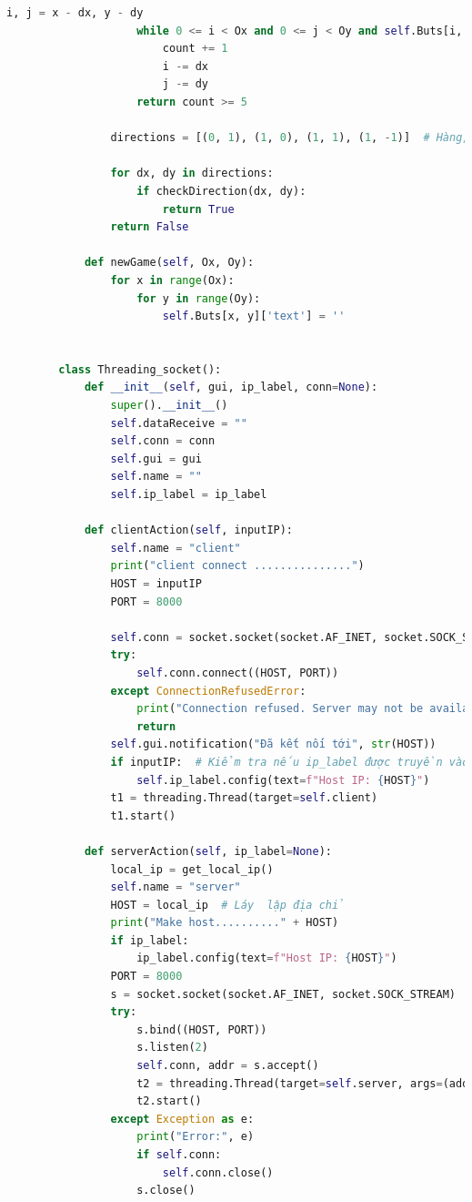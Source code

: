 \documentclass[a4paper]{article}
\begin{document}
\begin{lstlisting}[language=Python]
                    i, j = x - dx, y - dy
                    while 0 <= i < Ox and 0 <= j < Oy and self.Buts[i, j]["text"] == XO:
                        count += 1
                        i -= dx
                        j -= dy
                    return count >= 5
        
                directions = [(0, 1), (1, 0), (1, 1), (1, -1)]  # Hàng, cột, đường chéo phải, đường chéo trái
        
                for dx, dy in directions:
                    if checkDirection(dx, dy):
                        return True
                return False
        
            def newGame(self, Ox, Oy):
                for x in range(Ox):
                    for y in range(Oy):
                        self.Buts[x, y]['text'] = ''
        
        
        class Threading_socket():
            def __init__(self, gui, ip_label, conn=None):
                super().__init__()
                self.dataReceive = ""
                self.conn = conn
                self.gui = gui
                self.name = ""
                self.ip_label = ip_label
        
            def clientAction(self, inputIP):
                self.name = "client"
                print("client connect ...............")
                HOST = inputIP  
                PORT = 8000  
        
                self.conn = socket.socket(socket.AF_INET, socket.SOCK_STREAM) 
                try:
                    self.conn.connect((HOST, PORT))  
                except ConnectionRefusedError:
                    print("Connection refused. Server may not be available.")
                    return
                self.gui.notification("Đã kết nối tới", str(HOST))
                if inputIP:  # Kiểm tra nếu ip_label được truyền vào
                    self.ip_label.config(text=f"Host IP: {HOST}")  
                t1 = threading.Thread(target=self.client) 
                t1.start()
        
            def serverAction(self, ip_label=None):
                local_ip = get_local_ip()
                self.name = "server"
                HOST = local_ip  # Láy  lập địa chỉ
                print("Make host.........." + HOST)
                if ip_label:  
                    ip_label.config(text=f"Host IP: {HOST}")  
                PORT = 8000 
                s = socket.socket(socket.AF_INET, socket.SOCK_STREAM)
                try:
                    s.bind((HOST, PORT)) 
                    s.listen(2) 
                    self.conn, addr = s.accept() 
                    t2 = threading.Thread(target=self.server, args=(addr, s))
                    t2.start()
                except Exception as e:
                    print("Error:", e)
                    if self.conn:
                        self.conn.close()
                    s.close()
        

\end{lstlisting}
\end{document}
